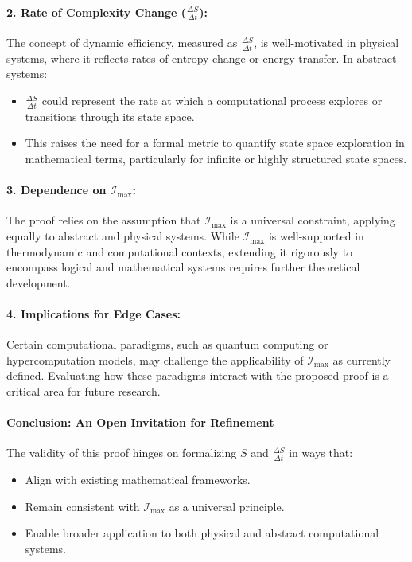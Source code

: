 \documentclass[12pt]{article}
\begin{document}
\paragraph{2. Rate of Complexity Change (\(\frac{\Delta S}{\Delta t}\)):}
The concept of dynamic efficiency, measured as \(\frac{\Delta S}{\Delta t}\), is well-motivated in physical systems, where it reflects rates of entropy change or energy transfer. In abstract systems:
\begin{itemize}
    \item \(\frac{\Delta S}{\Delta t}\) could represent the rate at which a computational process explores or transitions through its state space.
    \item This raises the need for a formal metric to quantify state space exploration in mathematical terms, particularly for infinite or highly structured state spaces.
\end{itemize}

\paragraph{3. Dependence on \(\mathcal{I}_{\text{max}}\):}
The proof relies on the assumption that \(\mathcal{I}_{\text{max}}\) is a universal constraint, applying equally to abstract and physical systems. While \(\mathcal{I}_{\text{max}}\) is well-supported in thermodynamic and computational contexts, extending it rigorously to encompass logical and mathematical systems requires further theoretical development.

\paragraph{4. Implications for Edge Cases:}
Certain computational paradigms, such as quantum computing or hypercomputation models, may challenge the applicability of \(\mathcal{I}_{\text{max}}\) as currently defined. Evaluating how these paradigms interact with the proposed proof is a critical area for future research.

\paragraph{Conclusion: An Open Invitation for Refinement}
The validity of this proof hinges on formalizing \(S\) and \(\frac{\Delta S}{\Delta t}\) in ways that:
\begin{itemize}
    \item Align with existing mathematical frameworks.
    \item Remain consistent with \(\mathcal{I}_{\text{max}}\) as a universal principle.
    \item Enable broader application to both physical and abstract computational systems.
\end{itemize}
\end{document}
